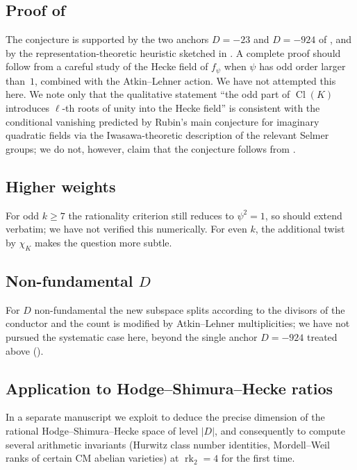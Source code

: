 \documentclass[11pt]{amsart}
\theoremstyle{definition}
\theoremstyle{remark}
\DeclareMathOperator{\Cl}{Cl}
\DeclareMathOperator{\rk}{rk}
\newcommand{\chiK}{\chi_K}
\begin{document}
\subsection*{Proof of }
The conjecture is supported by the two anchors \(D = -23\) and
\(D = -924\) of , and by the representation-theoretic
heuristic sketched in . A complete proof should follow
from a careful study of the Hecke field of \(f_\psi\) when \(\psi\)
has odd order larger than~\(1\), combined with the Atkin--Lehner
action. We have not attempted this here. We note only that the
qualitative statement ``the odd part of \(\Cl(K)\) introduces
\(\ell\)-th roots of unity into the Hecke field'' is consistent with
the conditional vanishing predicted by Rubin's main conjecture for
imaginary quadratic fields \cite{Rubin1991} via the Iwasawa-theoretic
description of the relevant Selmer groups; we do not, however, claim
that the conjecture follows from \cite{Rubin1991}.

\subsection*{Higher weights}
For odd \(k \ge 7\) the rationality criterion still reduces to
\(\psi^2 = 1\), so  should extend verbatim; we have
not verified this numerically. For even \(k\), the additional twist
by \(\chiK\) makes the question more subtle.

\subsection*{Non-fundamental \(D\)}
For \(D\) non-fundamental the new subspace splits according to the
divisors of the conductor and the count is modified by
Atkin--Lehner multiplicities; we have not pursued the systematic
case here, beyond the single anchor \(D = -924\) treated above
().

\subsection*{Application to Hodge--Shimura--Hecke ratios}
In a separate manuscript we exploit  to deduce the
precise dimension of the rational Hodge--Shimura--Hecke space of level
\(|D|\), and consequently to compute several arithmetic invariants
(Hurwitz class number identities, Mordell--Weil ranks of certain CM
abelian varieties) at \(\rk_2 = 4\) for the first time.

\appendix
\end{document}
